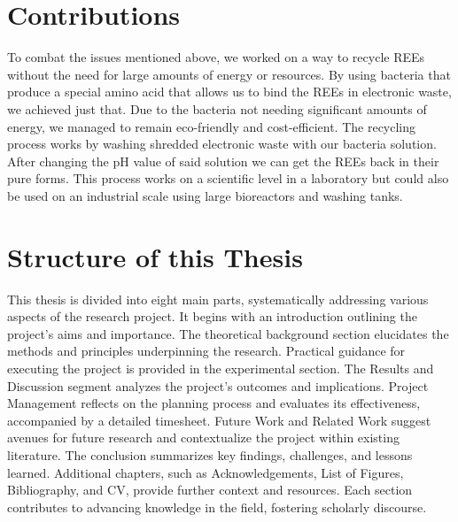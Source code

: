 \section{Contributions\authorB{}}
To combat the issues mentioned above, we worked on a way to recycle REEs without the
need for large amounts of energy or resources.
By using bacteria that produce a special amino acid that allows us to bind the REEs in electronic waste, we achieved just that.
Due to the bacteria not needing significant amounts of energy, we managed to remain eco-friendly and cost-efficient.
The recycling process works by washing shredded electronic waste with our bacteria solution.
After changing the pH value of said solution we can get
the REEs back in their pure forms.
This process works on a scientific level in a laboratory but could also be used on an industrial scale using large bioreactors and washing tanks.


\section{Structure of this Thesis\authorB{}}
This thesis is divided into eight main parts, systematically addressing various aspects of
the research project. It begins with an introduction outlining the project's aims and
importance. The theoretical background section elucidates the methods and principles
underpinning the research. Practical guidance for executing the project is provided in the
experimental section. The Results and Discussion segment analyzes the project's
outcomes and implications. Project Management reflects on the planning process and
evaluates its effectiveness, accompanied by a detailed timesheet. Future Work and
Related Work suggest avenues for future research and contextualize the project within
existing literature. The conclusion summarizes key findings, challenges, and lessons
learned. Additional chapters, such as Acknowledgements, List of Figures, Bibliography,
and CV, provide further context and resources. Each section contributes to advancing
knowledge in the field, fostering scholarly discourse.

